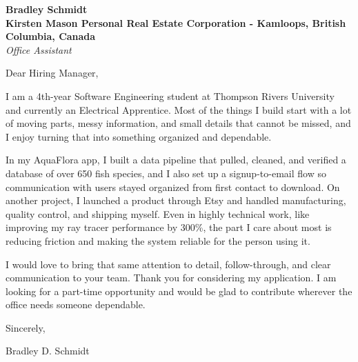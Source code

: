 \documentclass[11pt]{article}
\begin{document}
\textbf{Bradley Schmidt}\\
\vspace{0.5em}
\textbf{Kirsten Mason Personal Real Estate Corporation - Kamloops, British Columbia, Canada}\\
\textit{Office Assistant}

Dear Hiring Manager,

\par

I am a 4th-year Software Engineering student at Thompson Rivers University and currently an Electrical Apprentice. Most of the things I build start with a lot of moving parts, messy information, and small details that cannot be missed, and I enjoy turning that into something organized and dependable.

\par

In my AquaFlora app, I built a data pipeline that pulled, cleaned, and verified a database of over 650 fish species, and I also set up a signup-to-email flow so communication with users stayed organized from first contact to download. On another project, I launched a product through Etsy and handled manufacturing, quality control, and shipping myself. Even in highly technical work, like improving my ray tracer performance by 300\%, the part I care about most is reducing friction and making the system reliable for the person using it.

\par

I would love to bring that same attention to detail, follow-through, and clear communication to your team. Thank you for considering my application. I am looking for a part-time opportunity and would be glad to contribute wherever the office needs someone dependable.

\par

Sincerely,

\par

Bradley D. Schmidt
\end{document}
